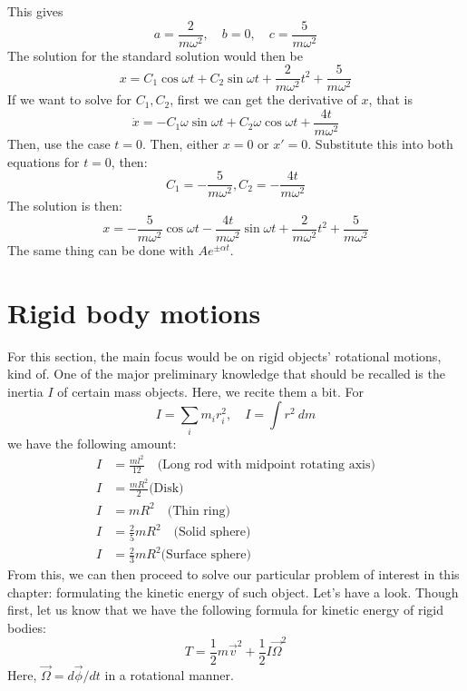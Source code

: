This gives
\begin{equation}
    a = \frac{2}{m\omega^{2}}, \quad b = 0 , \quad c= \frac{5}{m\omega^{2}}
\end{equation}
The solution for the standard solution would then be 
\begin{equation}
    x = C_{1}\cos{\omega t} + C_{2}\sin{\omega t} + \frac{2}{m\omega^{2}} t^{2} + \frac{5}{m\omega^{2}}
\end{equation}
If we want to solve for $C_{1},C_{2}$, first we can get the derivative of $x$, that is
\begin{equation}
    \dot{x} = -C_{1}\omega\sin{\omega t} + C_{2}\omega\cos{\omega t} + \frac{4t}{m\omega^{2}}
\end{equation}
Then, use the case $t=0$. Then, either $x=0$ or $x'=0$. Substitute this into both equations for $t=0$, then: 
\begin{equation}
    C_{1} = -\frac{5}{m\omega^{2}}, C_{2} = -\frac{4t}{m\omega^{2}}
\end{equation}
The solution is then: 
\begin{equation}
    x = -\frac{5}{m\omega^{2}}\cos{\omega t} -\frac{4t}{m\omega^{2}}\sin{\omega t}+ \frac{2}{m\omega^{2}} t^{2} + \frac{5}{m\omega^{2}}
\end{equation}
The same thing can be done with $Ae^{\pm\alpha t}$. 
\section{Rigid body motions}
For this section, the main focus would be on rigid objects' rotational motions, kind of. One of the major preliminary knowledge that should be recalled is the inertia $I$ of certain mass objects. Here, we recite them a bit. For 
\begin{equation}
    I = \sum_{i} m_{i}r_{i}^{2}, \quad I = \int r^{2}\:dm
\end{equation}
we have the following amount:
\begin{align}
    I & = \frac{ml^{2}}{12}\quad \text{(Long rod with midpoint rotating axis)}\\
    I & = \frac{mR^{2}}{2} \text{(Disk)}\\
    I & = mR^{2}\quad \text{(Thin ring)}\\
    I & = \frac{2}{5} mR^{2}\quad \text{(Solid sphere)}\\
    I & = \frac{2}{3} mR^{2} \text{(Surface sphere)}
\end{align}
From this, we can then proceed to solve our particular problem of interest in this chapter: formulating the kinetic energy of such object. Let's have a look. Though first, let us know that we have the following formula for kinetic energy of rigid bodies: 
\begin{equation}
    T = \frac{1}{2}m \vec{v}^{2} + \frac{1}{2} I \vec{\Omega}^{2}
\end{equation}
Here, $\vec{\Omega}=d\vec{\phi}/dt$ in a rotational manner. 
